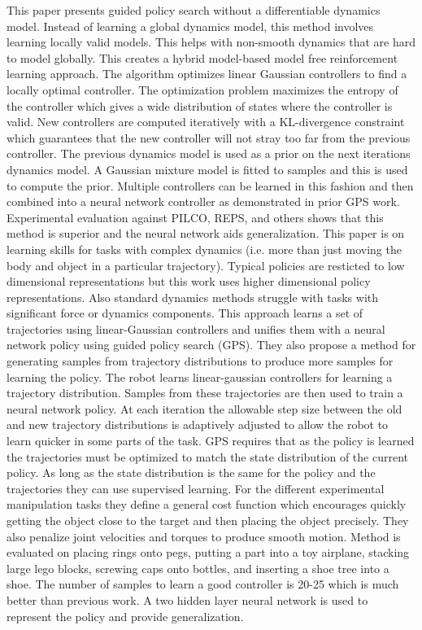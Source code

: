 \documentclass[12 pt]{article}
\begin{document}
This paper presents guided policy search without a differentiable dynamics model. Instead of learning a global dynamics model, this method involves learning locally valid models. This helps with non-smooth dynamics that are hard to model globally. This creates a hybrid model-based model free reinforcement learning approach. The algorithm optimizes linear Gaussian controllers to find a locally optimal controller. The optimization problem maximizes the entropy of the controller which gives a wide distribution of states where the controller is valid. New controllers are computed iteratively with a KL-divergence constraint which guarantees that the new controller will not stray too far from the previous controller. The previous dynamics model is used as a prior on the next iterations dynamics model. A Gaussian mixture model is fitted to samples and this is used to compute the prior. Multiple controllers can be learned in this fashion and then combined into a neural network controller as demonstrated in prior GPS work. Experimental evaluation against PILCO, REPS, and others shows that this method is superior and the neural network aids generalization.\cite{levine2014learning}
This paper is on learning skills for tasks with complex dynamics (i.e. more than just moving the body and object in a particular trajectory). Typical policies are resticted to low dimensional representations but this work uses higher dimensional policy representations. Also standard dynamics methods struggle with tasks with significant force or dynamics components. This approach learns a set of trajectories using linear-Gaussian controllers and unifies them with a neural network policy using guided policy search (GPS). They also propose a method for generating samples from trajectory distributions to produce more samples for learning the policy. The robot learns linear-gaussian controllers for learning a trajectory distribution. Samples from these trajectories are then used to train a neural network policy. At each iteration the allowable step size between the old and new trajectory distributions is adaptively adjusted to allow the robot to learn quicker in some parts of the task. GPS requires that as the policy is learned the trajectories must be optimized to match the state distribution of the current policy. As long as the state distribution is the same for the policy and the trajectories they can use supervised learning. For the different experimental manipulation tasks they define a general cost function which encourages quickly getting the object close to the target and then placing the object precisely. They also penalize joint velocities and torques to produce smooth motion. Method is evaluated on placing rings onto pegs, putting a part into a toy airplane, stacking large lego blocks, screwing caps onto bottles, and inserting a shoe tree into a shoe. The number of samples to learn a good controller is 20-25 which is much better than previous work. A two hidden layer neural network is used to represent the policy and provide generalization.\cite{levine2015learning}
\end{document}
